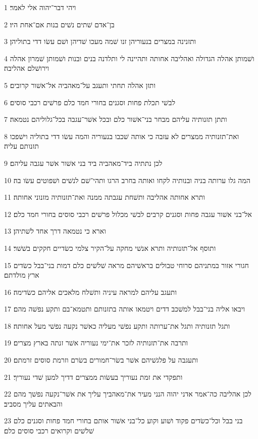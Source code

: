 \par 1 ויהי דבר־יהוה אלי לאמר׃
\par 2 בן־אדם שׁתים נשׁים בנות אם־אחת היו׃
\par 3 ותזנינה במצרים בנעוריהן זנו שׁמה מעכו שׁדיהן ושׁם עשׂו דדי בתוליהן׃
\par 4 ושׁמותן אהלה הגדולה ואהליבה אחותה ותהיינה לי ותלדנה בנים ובנות ושׁמותן שׁמרון אהלה וירושׁלם אהליבה׃
\par 5 ותזן אהלה תחתי ותעגב על־מאהביה אל־אשׁור קרובים׃
\par 6 לבשׁי תכלת פחות וסגנים בחורי חמד כלם פרשׁים רכבי סוסים׃
\par 7 ותתן תזנותיה עליהם מבחר בני־אשׁור כלם ובכל אשׁר־עגבה בכל־גלוליהם נטמאה׃
\par 8 ואת־תזנותיה ממצרים לא עזבה כי אותה שׁכבו בנעוריה והמה עשׂו דדי בתוליה וישׁפכו תזנותם עליה׃
\par 9 לכן נתתיה ביד־מאהביה ביד בני אשׁור אשׁר עגבה עליהם׃
\par 10 המה גלו ערותה בניה ובנותיה לקחו ואותה בחרב הרגו ותהי־שׁם לנשׁים ושׁפוטים עשׂו בה׃
\par 11 ותרא אחותה אהליבה ותשׁחת עגבתה ממנה ואת־תזנותיה מזנוני אחותה׃
\par 12 אל־בני אשׁור עגבה פחות וסגנים קרבים לבשׁי מכלול פרשׁים רכבי סוסים בחורי חמד כלם׃
\par 13 וארא כי נטמאה דרך אחד לשׁתיהן׃
\par 14 ותוסף אל־תזנותיה ותרא אנשׁי מחקה על־הקיר צלמי כשׂדיים חקקים בשׁשׁר׃
\par 15 חגורי אזור במתניהם סרוחי טבולים בראשׁיהם מראה שׁלשׁים כלם דמות בני־בבל כשׂדים ארץ מולדתם׃
\par 16 ותעגב עליהם למראה עיניה ותשׁלח מלאכים אליהם כשׂדימה׃
\par 17 ויבאו אליה בני־בבל למשׁכב דדים ויטמאו אותה בתזנותם ותטמא־בם ותקע נפשׁה מהם׃
\par 18 ותגל תזנותיה ותגל את־ערותה ותקע נפשׁי מעליה כאשׁר נקעה נפשׁי מעל אחותה׃
\par 19 ותרבה את־תזנותיה לזכר את־ימי נעוריה אשׁר זנתה בארץ מצרים׃
\par 20 ותעגבה על פלגשׁיהם אשׁר בשׂר־חמורים בשׂרם וזרמת סוסים זרמתם׃
\par 21 ותפקדי את זמת נעוריך בעשׂות ממצרים דדיך למען שׁדי נעוריך׃
\par 22 לכן אהליבה כה־אמר אדני יהוה הנני מעיר את־מאהביך עליך את אשׁר־נקעה נפשׁך מהם והבאתים עליך מסביב׃
\par 23 בני בבל וכל־כשׂדים פקוד ושׁוע וקוע כל־בני אשׁור אותם בחורי חמד פחות וסגנים כלם שׁלשׁים וקרואים רכבי סוסים כלם׃

